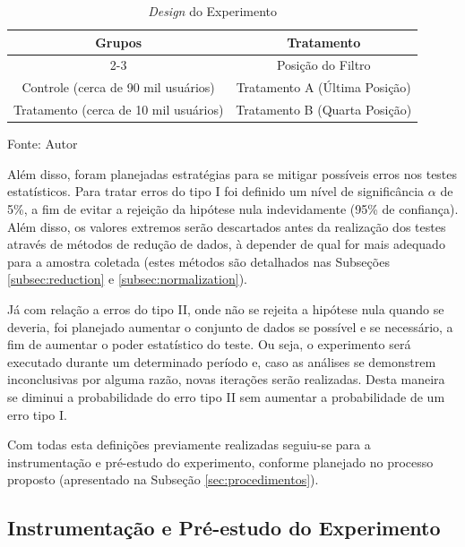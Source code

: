 \begin{table}[]
\centering

    \caption{\textit{Design} do Experimento}

    \begin{tabular}{|c|cl|}
        \hline
        \multirow{2}{*}{Grupos} & \multicolumn{2}{c|}{Tratamento} \\ \cline{2-3} 
         & \multicolumn{2}{c|}{Posição do Filtro} \\ \hline
        Controle (cerca de 90 mil usuários) & \multicolumn{2}{c|}{Tratamento A (Última Posição)} \\ \hline
        Tratamento (cerca de 10 mil usuários) & \multicolumn{2}{c|}{Tratamento B (Quarta Posição)} \\ \hline
    \end{tabular}

    \begin{center}
        \text Fonte: Autor
    \end{center}

    \label{tab:design}
\end{table}

Além disso, foram planejadas estratégias para se mitigar possíveis erros nos testes estatísticos. Para tratar erros do tipo I foi definido um nível de significância \(\alpha\) de 5\%, a fim de evitar a rejeição da hipótese nula indevidamente (95\% de confiança). Além disso, os valores extremos serão descartados antes da realização dos testes através de métodos de redução de dados, à depender de qual for mais adequado para a amostra coletada (estes métodos são detalhados nas Subseções \ref{subsec:reduction} e \ref{subsec:normalization}).

Já com relação a erros do tipo II, onde não se rejeita a hipótese nula quando se deveria, foi planejado aumentar o conjunto de dados se possível e se necessário, a fim de aumentar o poder estatístico do teste. Ou seja, o experimento será executado durante um determinado período e, caso as análises se demonstrem inconclusivas por alguma razão, novas iterações serão realizadas. Desta maneira se diminui a probabilidade do erro tipo II sem aumentar a probabilidade de um erro tipo I.

Com todas esta definições previamente realizadas seguiu-se para a instrumentação e pré-estudo do experimento, conforme planejado no processo proposto (apresentado na Subseção \ref{sec:procedimentos}).

\subsection{Instrumentação e Pré-estudo do Experimento}
\label{subsec:pre-estudo}


